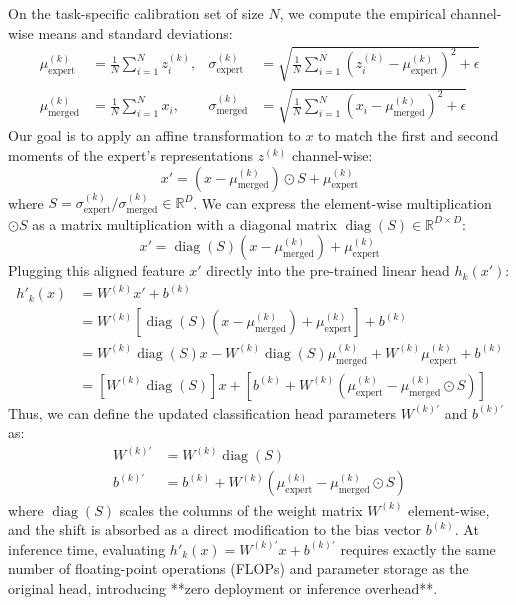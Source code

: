\documentclass{article}
\theoremstyle{plain}
\theoremstyle{definition}
\theoremstyle{remark}
\begin{document}
On the task-specific calibration set of size $N$, we compute the empirical channel-wise means and standard deviations:
\begin{align}
\mu_{\text{expert}}^{(k)} &= \frac{1}{N}\sum_{i=1}^N z^{(k)}_i, & \sigma_{\text{expert}}^{(k)} &= \sqrt{\frac{1}{N}\sum_{i=1}^N (z^{(k)}_i - \mu_{\text{expert}}^{(k)})^2 + \epsilon} \\
\mu_{\text{merged}}^{(k)} &= \frac{1}{N}\sum_{i=1}^N x_i, & \sigma_{\text{merged}}^{(k)} &= \sqrt{\frac{1}{N}\sum_{i=1}^N (x_i - \mu_{\text{merged}}^{(k)})^2 + \epsilon}
\end{align}
Our goal is to apply an affine transformation to $x$ to match the first and second moments of the expert's representations $z^{(k)}$ channel-wise:
\begin{equation}
x' = (x - \mu_{\text{merged}}^{(k)}) \odot S + \mu_{\text{expert}}^{(k)}
\end{equation}
where $S = \sigma_{\text{expert}}^{(k)} / \sigma_{\text{merged}}^{(k)} \in \mathbb{R}^D$.
We can express the element-wise multiplication $\odot S$ as a matrix multiplication with a diagonal matrix $\operatorname{diag}(S) \in \mathbb{R}^{D \times D}$:
\begin{equation}
x' = \operatorname{diag}(S) (x - \mu_{\text{merged}}^{(k)}) + \mu_{\text{expert}}^{(k)}
\end{equation}
Plugging this aligned feature $x'$ directly into the pre-trained linear head $h_k(x')$:
\begin{align}
h'_k(x) &= W^{(k)} x' + b^{(k)} \\
&= W^{(k)} \left[ \operatorname{diag}(S) (x - \mu_{\text{merged}}^{(k)}) + \mu_{\text{expert}}^{(k)} \right] + b^{(k)} \\
&= W^{(k)} \operatorname{diag}(S) x - W^{(k)} \operatorname{diag}(S) \mu_{\text{merged}}^{(k)} + W^{(k)} \mu_{\text{expert}}^{(k)} + b^{(k)} \\
&= \left[ W^{(k)} \operatorname{diag}(S) \right] x + \left[ b^{(k)} + W^{(k)} \left( \mu_{\text{expert}}^{(k)} - \mu_{\text{merged}}^{(k)} \odot S \right) \right]
\end{align}
Thus, we can define the updated classification head parameters $W^{(k)\prime}$ and $b^{(k)\prime}$ as:
\begin{align}
W^{(k)\prime} &= W^{(k)} \operatorname{diag}(S) \\
b^{(k)\prime} &= b^{(k)} + W^{(k)} \left( \mu_{\text{expert}}^{(k)} - \mu_{\text{merged}}^{(k)} \odot S \right)
\end{align}
where $\operatorname{diag}(S)$ scales the columns of the weight matrix $W^{(k)}$ element-wise, and the shift is absorbed as a direct modification to the bias vector $b^{(k)}$.
At inference time, evaluating $h'_k(x) = W^{(k)\prime} x + b^{(k)\prime}$ requires exactly the same number of floating-point operations (FLOPs) and parameter storage as the original head, introducing **zero deployment or inference overhead**.
\end{document}
